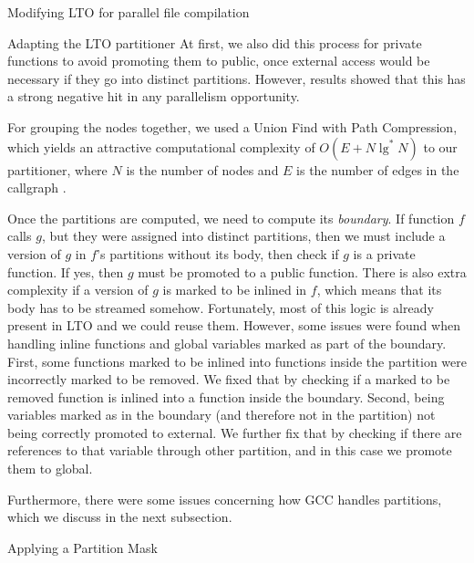 \begin{section}{Modifying LTO for parallel file compilation}
\begin{subsection}{Adapting the LTO partitioner}
At first, we also did this process for private functions to avoid
promoting them to public, once external access would be necessary if they go
into distinct partitions. However, results showed that this has a strong
negative hit in any parallelism opportunity.

For grouping the nodes together,
we used a Union Find with Path Compression, which yields an attractive
computational complexity of $O(E + N \lg^*N)$ to our partitioner, where $N$ is the
number of nodes and $E$ is the number of edges in the callgraph \cite{feufiloff}.

Once the partitions are computed, we need to compute its \textit{boundary}.
If function $f$ calls $g$, but they were assigned into distinct partitions,
then we must include a version of $g$ in $f$'s partitions without its body,
then check if $g$ is a private function. If yes, then $g$ must be promoted
to a public function. There is also extra complexity if a version of $g$
is marked to be inlined in $f$, which means that its body has to be
streamed somehow. Fortunately, most of this logic is already present
in LTO and we could reuse them. However, some issues were found
when handling inline functions and global variables marked as part
of the boundary. First, some functions marked to be inlined into 
functions inside the partition were incorrectly marked to be removed.
We fixed that by checking if a marked to be removed function is inlined
into a function inside the boundary.
Second, being variables marked as in the boundary (and therefore
not in the partition) not being correctly promoted to external.
We further fix that by checking if there are references to that variable
through other partition, and in this case we promote them to global.

Furthermore, there were some issues concerning how GCC handles
partitions, which we discuss in the next subsection.

\end{subsection}

\begin{subsection}{Applying a Partition Mask}\label{sec:partition_mask}


\end{subsection}
\end{section}
